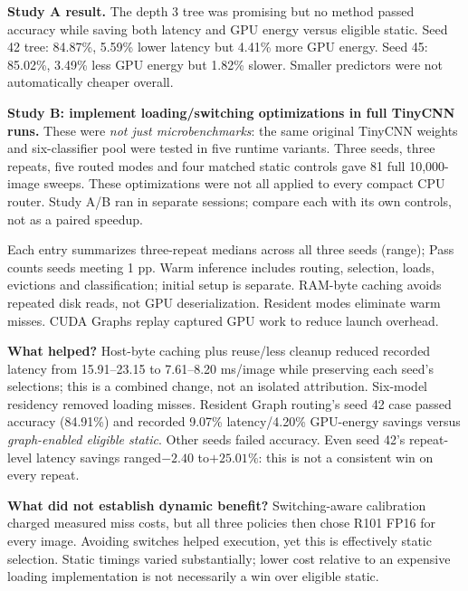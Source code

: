 \documentclass[10pt,a4paper]{article}
\newcommand{\smallcap}[1]{{\footnotesize\color{navy}#1}\par}
\begin{document}
\textbf{Study A result.} The depth 3 tree was promising but no method passed accuracy while saving both latency and GPU energy versus eligible static. Seed 42 tree: 84.87\%, 5.59\% lower latency but 4.41\% more GPU energy. Seed 45: 85.02\%, 3.49\% less GPU energy but 1.82\% slower. Smaller predictors were not automatically cheaper overall.

\textbf{Study B: implement loading/switching optimizations in full TinyCNN runs.} These were \emph{not just microbenchmarks}: the same original TinyCNN weights and six-classifier pool were tested in five runtime variants. Three seeds, three repeats, five routed modes and four matched static controls gave 81 full 10,000-image sweeps. These optimizations were not all applied to every compact CPU router. Study A/B ran in separate sessions; compare each with its own controls, not as a paired speedup.
\begin{center}\small\end{center}
\smallcap{Each entry summarizes three-repeat medians across all three seeds (range); Pass counts seeds meeting 1 pp. Warm inference includes routing, selection, loads, evictions and classification; initial setup is separate. RAM-byte caching avoids repeated disk reads, not GPU deserialization. Resident modes eliminate warm misses. CUDA Graphs replay captured GPU work to reduce launch overhead.}

\textbf{What helped?} Host-byte caching plus reuse/less cleanup reduced recorded latency from 15.91--23.15 to 7.61--8.20 ms/image while preserving each seed's selections; this is a combined change, not an isolated attribution. Six-model residency removed loading misses. Resident Graph routing's seed 42 case passed accuracy (84.91\%) and recorded 9.07\% latency/4.20\% GPU-energy savings versus \emph{graph-enabled eligible static}. Other seeds failed accuracy. Even seed 42's repeat-level latency savings ranged$-2.40$ to$+25.01\%$: this is not a consistent win on every repeat.

\textbf{What did not establish dynamic benefit?} Switching-aware calibration charged measured miss costs, but all three policies then chose R101 FP16 for every image. Avoiding switches helped execution, yet this is effectively static selection. Static timings varied substantially; lower cost relative to an expensive loading implementation is not necessarily a win over eligible static.
\end{document}
